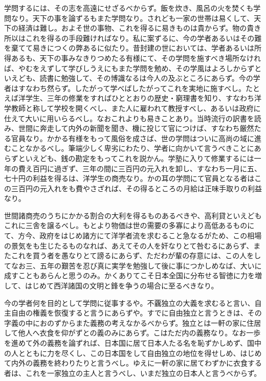 \documentclass[a4paper, platex, dvipdfmx]{jsarticle}
\begin{document}
学問するには、その志を高遠にせざるべからず。飯を炊き、風呂の火を焚くも学問なり。天下の事を論ずるもまた学問なり。されども一家の世帯は易くして、天下の経済は難し。およそ世の事物、これを得るに易きものは貴からず。物の貴き所以はこれを得るの手段難ければなり。私に案ずるに、今の学者あるいはその難を棄てて易きにつくの弊あるに似たり。昔封建の世においては、学者あるいは所得あるも、天下の事みなきりつめたる有様にて、その学問を施すべき場所なければ、やむをえずして学びしうえにもまた学問を勉め、その学風はよろしからずといえども、読書に勉強して、その博識なるは今人の及ぶところにあらず。今の学者はすなわち然らず。したがって学べばしたがってこれを実地に施すべし。たとえば洋学生、三年の修業をすればひととおりの歴史・窮理書を知り、すなわち洋学教師と称して学校を開くべし、また人に雇われて教授すべし、あるいは政府に仕えて大いに用いらるべし。なおこれよりも易きことあり。当時流行の訳書を読み、世間に奔走して内外の新聞を聞き、機に投じて官につけば、すなわち厳然たる官員なり。かかる有様をもって風俗を成さば、世の学問はついに高尚の域に進むことなかるべし。筆端少しく卑劣にわたり、学者に向かいて言うべきことにあらずといえども、銭の勘定をもってこれを説かん。学塾に入りて修業するには一年の費え百円に過ぎず、三年の間に三百円の元入れを卸し、すなわち一月に五、七十円の利益を得るは、洋学生の商売なり。かの耳の学問にて官員となる者はこの三百円の元入れをも費やさざれば、その得るところの月給は正味手取りの利益なり。

世間諸商売のうちにかかる割合の大利を得るものあるべきや、高利貸といえどもこれに三舎を譲るべし。もとより物価は世の需要の多寡により高低あるものにて、方今、政府をはじめ諸方にて洋学者流を求むること急なるがため、この相場の景気をも生じたるものなれば、あえてその人を奸なりとて咎むるにあらず、またこれを買う者を愚なりとて謗るにあらず、ただわが輩の存意には、この人をしてなお三、五年の艱苦を忍び真に実学を勉強して後に事につかしめなば、大いに成すこともあらんと思うのみ。かくありてこそ日本全国に分布せる智徳に力を増して、はじめて西洋諸国の文明と鋒を争うの場合に至るべきなり。

今の学者何を目的として学問に従事するや。不覊独立の大義を求むると言い、自主自由の権義を恢復すると言うにあらずや。すでに自由独立と言うときは、その字義の中におのずからまた義務の考えなかるべからず。独立とは一軒の家に住居して他人へ衣食を仰がずとの義のみにあらず。こはただ内の義務なり。なお一歩を進めて外の義務を論ずれば、日本国に居て日本人たる名を恥ずかしめず、国中の人とともに力を尽くし、この日本国をして自由独立の地位を得せしめ、はじめて内外の義務を終わりたりと言うべし。ゆえに一軒の家に居てわずかに衣食する者は、これを一家独立の主人と言うべし、いまだ独立の日本人と言うべからず。
\end{document}
